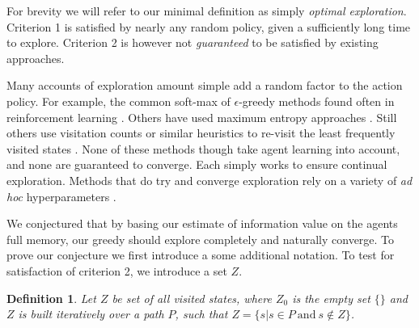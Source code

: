 \documentclass[9pt,twocolumn,twoside]{pnas-new}
\newtheorem{definition}{Definition}
\begin{document}


For brevity we will refer to our minimal definition as simply \textit{optimal exploration}. Criterion 1 is satisfied by nearly any random policy, given a sufficiently long time to explore. Criterion 2 is however not \textit{guaranteed} to be satisfied by existing approaches.  

Many accounts of exploration amount simple add a random factor to the action policy. For example, the common soft-max of $\epsilon$-greedy methods found often in reinforcement learning \cite{Sutton2018a}. Others have used maximum entropy approaches \cite{Haarnoja2018,Haarnoja2015}. Still others use visitation counts or similar heuristics to re-visit the least frequently visited states \cite{Kulkarni2016,Sutton2018,Bellemare2016}. None of these methods though take agent learning into account, and none are guaranteed to converge. Each simply works to ensure continual exploration. Methods that do try and converge exploration rely on a variety of \textit{ad hoc} hyperparameters \cite{Sutton2018a}. 

We conjectured that by basing our estimate of information value on the agents full memory, our greedy should explore completely and naturally converge. To prove our conjecture we first introduce a some additional notation. To test for satisfaction of criterion 2, we introduce a set $Z$. 

\begin{definition}
    Let $Z$ be set of all visited states, where $Z_0$ is the empty set $\{\}$ and $Z$ is built iteratively over a path $P$, such that $Z = \{s | s \in P\ \text{and}\ s \not\in Z\}$.    
\end{definition}

\end{document}
